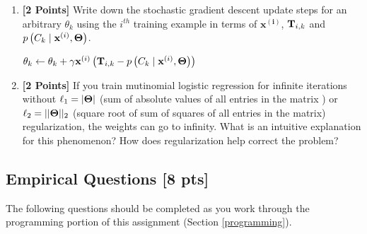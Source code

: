 \begin{enumerate}[label=(\alph*)]
   
    \clearpage
    
    \item {\bf [2 Points]} Write down the stochastic gradient descent update steps for an arbitrary $\theta_k$ using the $i^{th}$ training example in terms of $\mathbf{x^{(i)}}$, $\mathbf{T}_{i, k}$ and $p\left(C_k \mid \mathbf{x}^{(i)}, \boldsymbol \Theta\right)$.
    
    \begin{solution}
    $\theta_k \leftarrow \theta_k + \gamma  \mathbf{x}^{(i)}\left(\mathbf{T}_{i, k} - p\left(C_k \mid \mathbf{x}^{(i)}, \boldsymbol \Theta\right)\right)$
    \bigskip \bigskip \bigskip \bigskip \bigskip \bigskip \bigskip \bigskip
    \bigskip \bigskip \bigskip \bigskip \bigskip \bigskip \bigskip \bigskip
    
    \end{solution}
    
    
    
    \item {\bf [2 Points]} If you train mutinomial logistic regression for infinite iterations without $\ell_1 = |\boldsymbol \Theta|$ (sum of absolute values of all entries in the matrix ) or $\ell_2=||\boldsymbol \Theta||_2$ (square root of sum of squares of all entries in the matrix) regularization, the weights can go to infinity. What is an intuitive explanation for this phenomenon? How does regularization help correct the problem?
    
    \begin{solution}
    \bigskip \bigskip \bigskip \bigskip \bigskip \bigskip \bigskip \bigskip
    \bigskip \bigskip \bigskip \bigskip \bigskip \bigskip \bigskip \bigskip
    \bigskip \bigskip \bigskip \bigskip \bigskip \bigskip \bigskip \bigskip    
    \end{solution}
    
    
    \clearpage
    
\end{enumerate}

\subsection{Empirical Questions [8 pts]}
\label{sec:empirical}

The following questions should be completed as you work through the programming portion of this assignment (Section \ref{programming}).

